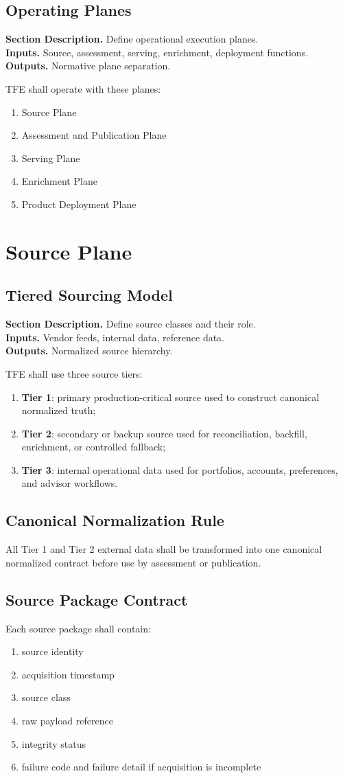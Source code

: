 \documentclass[11pt]{report}
\newcommand{\meta}[3]{\textbf{Section Description.} #1\\
\textbf{Inputs.} #2\\
\textbf{Outputs.} #3\par}
\begin{document}
\section{Operating Planes}
\meta{Define operational execution planes.}{Source, assessment, serving, enrichment, deployment functions.}{Normative plane separation.}

TFE shall operate with these planes:
\begin{enumerate}[leftmargin=1.2cm]
    \item Source Plane
    \item Assessment and Publication Plane
    \item Serving Plane
    \item Enrichment Plane
    \item Product Deployment Plane
\end{enumerate}

\chapter{Source Plane}
\section{Tiered Sourcing Model}
\meta{Define source classes and their role.}{Vendor feeds, internal data, reference data.}{Normalized source hierarchy.}

TFE shall use three source tiers:
\begin{enumerate}[leftmargin=1.2cm]
    \item \textbf{Tier 1}: primary production-critical source used to construct canonical normalized truth;
    \item \textbf{Tier 2}: secondary or backup source used for reconciliation, backfill, enrichment, or controlled fallback;
    \item \textbf{Tier 3}: internal operational data used for portfolios, accounts, preferences, and advisor workflows.
\end{enumerate}

\section{Canonical Normalization Rule}
All Tier 1 and Tier 2 external data shall be transformed into one canonical normalized contract before use by assessment or publication.

\section{Source Package Contract}
Each source package shall contain:
\begin{enumerate}[leftmargin=1.2cm]
    \item source identity
    \item acquisition timestamp
    \item source class
    \item raw payload reference
    \item integrity status
    \item failure code and failure detail if acquisition is incomplete
\end{enumerate}
\end{document}
